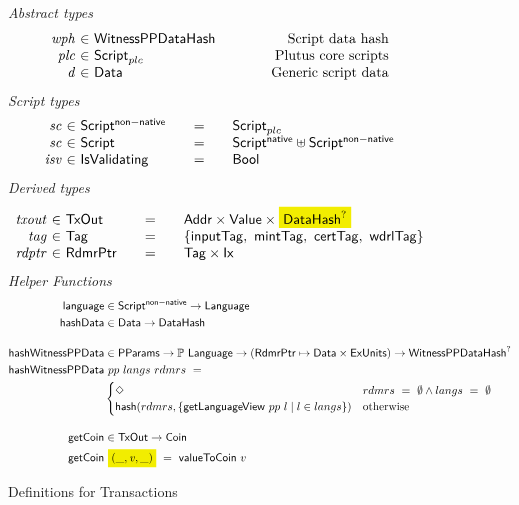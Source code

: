 \begin{figure*}[htb]
  \emph{Abstract types}
  \begin{equation*}
    \begin{array}{r@{~\in~}l@{\quad\quad\quad\quad}r}
      \var{wph} &\WitnessPPDataHash & \text{Script data hash}\\
      \var{plc} & \ScriptPlutus & \text{Plutus core scripts} \\
      \var{d} & \Data & \text{Generic script data}
    \end{array}
  \end{equation*}
  \emph{Script types}
  \begin{equation*}
    \begin{array}{r@{~\in~}l@{\qquad=\qquad}lr}
      \var{sc} & \ScriptNonNative & \ScriptPlutus \\
      \var{sc} & \Script & \ScriptNative \uniondistinct \ScriptNonNative \\
      \var{isv} & \IsValidating & \Bool
    \end{array}
  \end{equation*}
%
  \emph{Derived types}
  \begin{equation*}
    \begin{array}{r@{~\in~}l@{\qquad=\qquad}lr}
      \var{txout}
      & \TxOut
      & \Addr \times \Value \times \hldiff{\DataHash^?}
      \\
      \var{tag}
      & \Tag
      & \{\mathsf{inputTag},~\mathsf{mintTag},~\mathsf{certTag},~\mathsf{wdrlTag}\}
      \\
      \var{rdptr}
      & \RdmrPtr
      & \Tag \times \Ix
    \end{array}
  \end{equation*}
  \emph{Helper Functions}
  \begin{align*}
    \fun{language}& \in \ScriptNonNative \to \Language\\
    \fun{hashData}& \in \Data \to \DataHash
    \nextdef
    \fun{hashWitnessPPData}&\in\PParams \to \powerset{\Language} \to (\RdmrPtr \mapsto \Data \times \ExUnits) \to \WitnessPPDataHash^? \\
    \fun{hashWitnessPPData}&~{pp}~{langs}~{rdmrs}~=~ \\
                          &\begin{cases}
                            \Nothing & rdmrs~=~\emptyset \land langs~=~\emptyset \\
                            \fun{hash} (rdmrs, \{ \fun{getLanguageView}~pp~l \mid l \in langs \}) & \text{otherwise}
                          \end{cases}
    \nextdef
    \fun{getCoin}& \in \TxOut \to \Coin \\
    \fun{getCoin}&~\hldiff{{(\_, \var{v}, \_)}} ~=~\fun{valueToCoin}~{v}
  \end{align*}
  \caption{Definitions for Transactions}
  \label{fig:defs:utxo-shelley-1}
\end{figure*}


